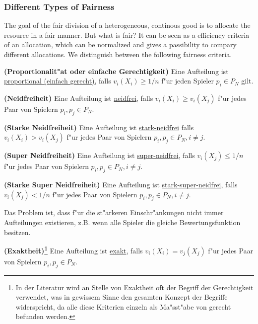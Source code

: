 \subsubsection{Different Types of Fairness}
The goal of the fair division of a heterogeneous, continous good is to allocate the resource in a fair manner. But what is fair? It can be seen as a efficiency criteria of an allocation, which can be normalized and gives a passibility to compary different allocations. We distinguish between the following fairness criteria. \\
\begin{defi}{\textbf{(Proportionalit"at oder einfache Gerechtigkeit)}}
\newline Eine Aufteilung ist \underline{proportional (einfach gerecht)}, falls
$v_i(X_i) \geq 1/n$ f"ur jeden Spieler $p_i \in P_N$ gilt.
\end{defi}
\begin{defi}{\textbf{(Neidfreiheit)}}
\newline Eine Aufteilung ist \underline{neidfrei}, falls $v_i(X_i) \geq
v_i(X_j)$ f"ur jedes Paar von Spielern $p_i, p_j \in P_N$.
\end{defi}
\begin{defi}{\textbf{(Starke Neidfreiheit)}}
\newline  Eine Aufteilung ist \underline{stark-neidfrei} falls $v_i(X_i) >
v_i(X_j)$ f"ur jedes Paar von Spielern $p_i, p_j \in P_N, i \neq j$.
\end{defi}
\begin{defi}{\textbf{(Super Neidfreiheit)}}
\newline Eine Aufteilung ist \underline{super-neidfrei}, falls $v_i(X_j) \leq
1/n$  f"ur jedes Paar von Spielern $p_i, p_j \in P_N, i \neq j$.
\end{defi}
\begin{defi}{\textbf{(Starke Super Neidfreiheit)}}
\newline Eine Aufteilung ist \underline{stark-super-neidfrei}, falls $v_i(X_j) <
1/n$  f"ur jedes Paar von Spielern $p_i, p_j \in P_N, i \neq j$.
\end{defi}
Das Problem ist, dass f"ur die st"arkeren Einschr"ankungen nicht immer
Aufteilungen existieren, z.B. wenn alle Spieler die gleiche Bewertungsfunktion
besitzen.
\begin{defi}{\textbf{(Exaktheit)\footnote{In der Literatur wird an Stelle von
Exaktheit oft der Begriff der Gerechtigkeit verwendet, was in gewissem Sinne den
gesamten Konzept der Begriffe widerspricht, da alle diese Kriterien einzeln als
Ma"sst"abe von gerecht befunden werden.}}}
\newline Eine Aufteilung ist \underline{exakt}, falls $v_i(X_i) = v_j(X_j)$ f"ur
jedes Paar von Spielern $p_i, p_j \in P_N$.
\end{defi}
